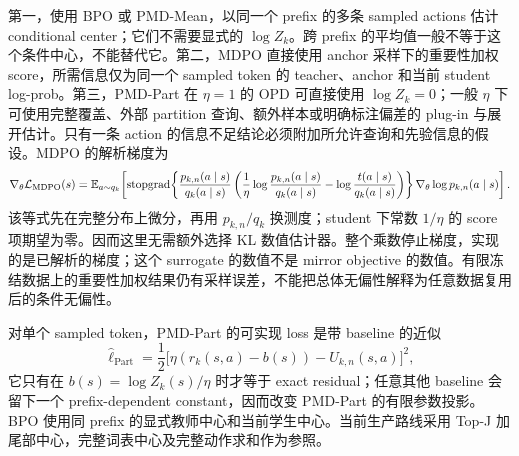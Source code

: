 第一，使用 BPO 或 PMD-Mean，以同一个 prefix 的多条 sampled actions 估计 conditional center；它们不需要显式的 $\log Z_k$。跨 prefix 的平均值一般不等于这个条件中心，不能替代它。第二，MDPO 直接使用 anchor 采样下的重要性加权 score，所需信息仅为同一个 sampled token 的 teacher、anchor 和当前 student log-prob。第三，PMD-Part 在 $\eta=1$ 的 OPD 可直接使用 $\log Z_k=0$；一般 $\eta$ 下可使用完整覆盖、外部 partition 查询、额外样本或明确标注偏差的 plug-in 与展开估计。只有一条 action 的信息不足结论必须附加所允许查询和先验信息的假设。MDPO 的解析梯度为
\begin{equation}
\nabla_\theta\mathcal L_{\mathrm{MDPO}}(s)
=\mathbb E_{a\sim q_k}\!\left[
\operatorname{stopgrad}\!\left\{
\frac{p_{k,n}(a\mid s)}{q_k(a\mid s)}
\left(\frac{1}{\eta}\log\frac{p_{k,n}(a\mid s)}{q_k(a\mid s)}
-\log\frac{t(a\mid s)}{q_k(a\mid s)}\right)
\right\}\nabla_\theta\log p_{k,n}(a\mid s)\right].
\end{equation}
该等式先在完整分布上微分，再用 $p_{k,n}/q_k$ 换测度；student 下常数 $1/\eta$ 的 score 项期望为零。因而这里无需额外选择 KL 数值估计器。整个乘数停止梯度，实现的是已解析的梯度；这个 surrogate 的数值不是 mirror objective 的数值。有限冻结数据上的重要性加权结果仍有采样误差，不能把总体无偏性解释为任意数据复用后的条件无偏性。

对单个 sampled token，PMD-Part 的可实现 loss 是带 baseline 的近似
\begin{equation}
\widehat\ell_{\mathrm{Part}}=\frac12\bigl[\eta(r_k(s,a)-b(s))-U_{k,n}(s,a)\bigr]^2,
\end{equation}
它只有在 $b(s)=\log Z_k(s)/\eta$ 时才等于 exact residual；任意其他 baseline 会留下一个 prefix-dependent constant，因而改变 PMD-Part 的有限参数投影。BPO 使用同 prefix 的显式教师中心和当前学生中心。当前生产路线采用 Top-J 加尾部中心，完整词表中心及完整动作求和作为参照。

